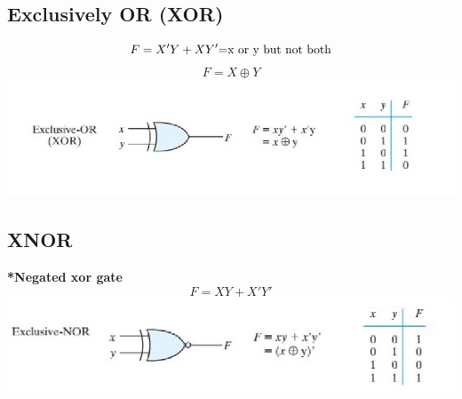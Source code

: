 \documentclass[a4paper,12pt]{article}
\begin{document}
                \subsection*{Exclusively OR (XOR)}
                    \[F=X'Y+XY'\textnormal{=x or y but not both}\] \[F=X\oplus  Y\]
                    \includegraphics*[width=15cm]{XOR gate.jpg}
                \subsection*{XNOR}
                    \textbf{*Negated xor gate} \[F=XY+X'Y'\] \includegraphics*[width=15cm]{XNOR gate.jpg}
\end{document}
